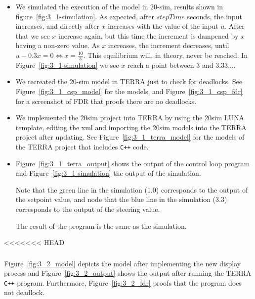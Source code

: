 \documentclass[a4paper,twoside,11pt]{article}
\newcommand{\cpp}{{\tt C++} }
\begin{document}
\subsubsection{}
\begin{itemize}
	\item We simulated the execution of the model in 20-sim, results shown in figure~\ref{fig:3_1-simulation}.
		As expected, after $stepTime$ seconds, the input increases, and directly after $x$ increases with the value of the input $u$.
		After that we see $x$ increase again, but this time the increment is dampened by $x$ having a non-zero value.
		As $x$ increases, the increment decreases, until $u - 0.3x = 0 \Leftrightarrow x=\frac{10}{3}$.
		This equilibrium will, in theory, never be reached.
		In Figure~\ref{fig:3_1-simulation} we see $x$ reach a point between $3$ and $3.33...$.

	\item We recreated the 20-sim model in TERRA just to check for deadlocks.
		See Figure~\ref{fig:3_1_csp_model} for the models, and Figure~\ref{fig:3_1_csp_fdr} for a screenshot of FDR that proofs there are no deadlocks.

	\item We implemented the 20sim project into TERRA by using the 20sim LUNA template, editing the xml and importing 
		the 20sim models into the TERRA project after updating.
		See Figure~\ref{fig:3_1_terra_model} for the models of the TERRA project that includes \cpp code.
	\item Figure~\ref{fig:3_1_terra_output} shows the output of the control 
		loop program and Figure~\ref{fig:3_1-simulation} the output of the simulation.

		Note that the green line in the simulation (1.0) corresponds to the output of the setpoint value, and
		node that the blue line in the simulation (3.3) corresponds to the output of the steering value.

		The result of the program is the same as the simulation.
\end{itemize}

<<<<<<< HEAD
\subsubsection{}
Figure~\ref{fig:3_2_model} depicts the model after implementing the new display 
process and Figure~\ref{fig:3_2_output} shows the output after running the TERRA 
\cpp program. Furthermore, Figure~\ref{fig:3_2_fdr} proofs that the program does not
deadlock.
\end{document}
